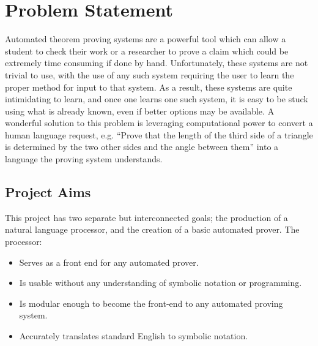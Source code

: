 \section{Problem Statement}                                                                           
Automated theorem proving systems are a powerful tool which can allow a student to check their work or a 
researcher to prove a claim which could be extremely time consuming if done by hand. Unfortunately, these
systems are not trivial to use, with the use of any such system requiring the user to learn the proper method for input to that system. As a result, these systems are quite intimidating to learn, and once one learns one such system, it is easy to be stuck using what is already known, even if better options may be available. A wonderful solution to this problem is leveraging computational power to convert a human language request, e.g. ``Prove that the length of the third side of a triangle is determined by the two other sides and the angle between them'' into a language the proving system understands.                     
                                                                                                           
                                                                                                           
  \subsection{Project Aims}                                                                                
This project has two separate but interconnected goals; the production of a natural language processor, and the creation of a basic automated prover. The processor:                                              
  \begin{itemize}                                                                                          
  \item{Serves as a front end for any automated prover.}                                                   
  \item{Is usable without any understanding of symbolic notation or programming.}                          
  \item{Is modular enough to become the front-end to any automated proving system.}                        
  \item{Accurately translates standard English to symbolic notation.}                                      
  \end{itemize}                                                                                            
                                                                                                           
